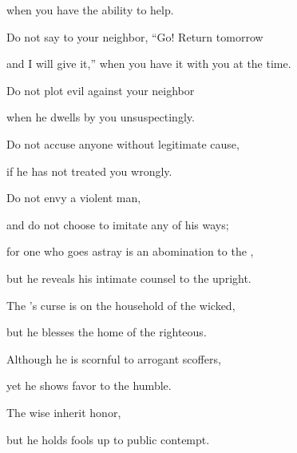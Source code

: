 {\par }{\Q when
you have the ability to help.
\par }{\Q {}Do not
say
to your neighbor,
“Go! Return
tomorrow
\par }{\Q and I will give
it,” when you have
it with you at the time.
\par }{\Q {}Do not
plot
evil
against
your neighbor
\par }{\Q when
he dwells
by you unsuspectingly.
\par }{\Q {}Do not
accuse
anyone
without legitimate cause,
\par }{\Q if
he has not
treated
you wrongly.
\par }{\Q {}Do not
envy
a violent
man,
\par }{\Q and do not
choose
to imitate any
of his ways;
\par }{\Q {}for
one who goes astray
is an abomination
to the
{},
\par }{\Q but he reveals his intimate counsel
to the upright.
\par }{\Q {}The
{}’s
curse
is on the household
of the wicked,
\par }{\Q but he blesses
the home
of the righteous.
\par }{\Q {}Although
he is
scornful
to arrogant scoffers,
\par }{\Q yet he shows
favor
to the humble.
\par }{\Q {}The wise
inherit
honor,
\par }{\Q but he holds fools
up
to public
contempt.


}
